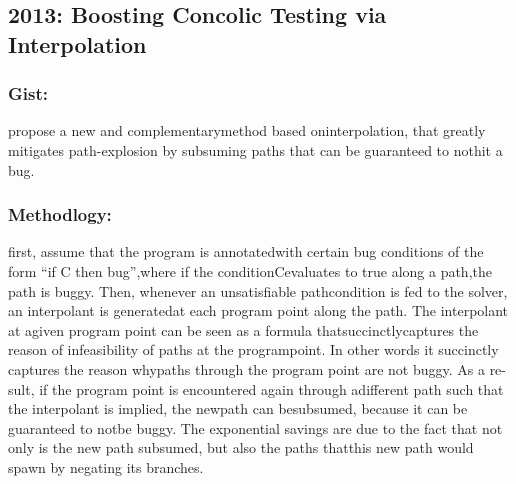 \documentclass[	runningheads,
				a4paper]{llncs}
\begin{document}
\subsection{2013: Boosting Concolic Testing via Interpolation}
\subsubsection{Gist:}
propose  a  new  and  complementarymethod based oninterpolation, that greatly mitigates path-explosion by subsuming paths that can be guaranteed to nothit a bug.

\subsubsection{Methodlogy:}
first,  assume  that  the  program  is  annotatedwith  certain  bug  conditions  of  the  form “if C then bug”,where  if  the  conditionCevaluates  to  true  along  a  path,the  path  is  buggy.   Then,  whenever  an  unsatisfiable  pathcondition  is  fed  to  the  solver,  an  interpolant  is  generatedat each program point along the path.  The interpolant at agiven program point can be seen as a formula thatsuccinctlycaptures the reason of infeasibility of paths at the programpoint.  In other words it succinctly captures the reason whypaths through the program point are not buggy.  As a re-sult,  if  the  program  point  is  encountered  again  through  adifferent path such that the interpolant is implied, the newpath can besubsumed, because it can be guaranteed to notbe buggy. The exponential savings are due to the fact that not only is the new path subsumed, but also the paths thatthis new path would spawn by negating its branches.
\end{document}
